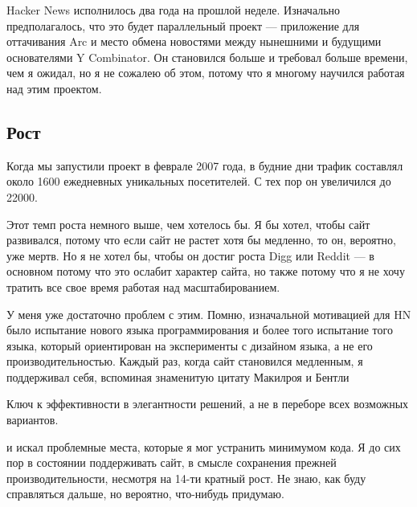 \documentclass[ebook,12pt,oneside,openany]{memoir}
\begin{document}
\maketitle

Hacker News исполнилось два года на прошлой неделе. Изначально
предполагалось, что это будет параллельный проект — приложение для
оттачивания Arc и место обмена новостями между нынешними и будущими
основателями Y Combinator. Он становился больше и требовал больше
времени, чем я ожидал, но я не сожалею об этом, потому что я многому
научился работая над этим проектом. \newline

\subsection{Рост}

Когда мы запустили проект в феврале 2007 года, в будние дни трафик
составлял около 1600 ежедневных уникальных посетителей. С тех пор он
увеличился до 22000. \newline

Этот темп роста немного выше, чем хотелось бы. Я бы хотел, чтобы сайт
развивался, потому что если сайт не растет хотя бы медленно, то он,
вероятно, уже мертв. Но я не хотел бы, чтобы он достиг роста Digg или
Reddit — в основном потому что это ослабит характер сайта, но также
потому что я не хочу тратить все свое время работая над
масштабированием. \newline

У меня уже достаточно проблем с этим. Помню, изначальной мотивацией
для HN было испытание нового языка программирования и более того
испытание того языка, который ориентирован на эксперименты с дизайном
языка, а не его производительностью. Каждый раз, когда сайт становился
медленным, я поддерживал себя, вспоминая знаменитую цитату Макилроя и
Бентли \newline

\begin{displayquote}
Ключ к эффективности в элегантности решений, а не в переборе всех
возможных вариантов. \newline
\end{displayquote}

и искал проблемные места, которые я мог устранить минимумом кода. Я до
сих пор в состоянии поддерживать сайт, в смысле сохранения прежней
производительности, несмотря на 14-ти кратный рост. Не знаю, как буду
справляться дальше, но вероятно, что-нибудь придумаю. \newline
\end{document}

